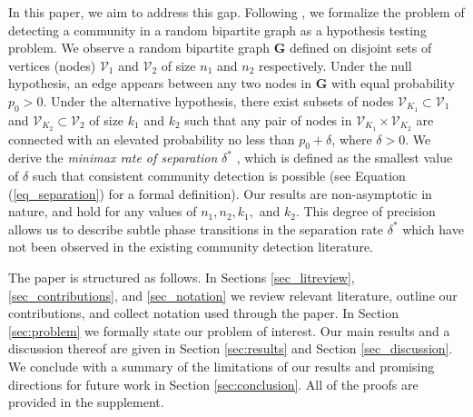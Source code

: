 \documentclass{article}
\newcommand{\bG}{\mathbf{G}}
\newcommand{\cV}{\mathcal{V}}
\begin{document}
In this paper, we aim to address this gap. Following \cite{arias2014community, verzelen2015community}, we formalize the problem of detecting a community in a random bipartite graph as a hypothesis testing problem. We observe a random bipartite graph $\bG$ defined on disjoint sets of vertices (nodes) $\cV_1$ and $\cV_2$ of size $n_1$ and $n_2$ respectively. Under the null hypothesis, an edge appears between any two nodes in $\bG$ with equal probability $p_0 > 0$. Under the alternative hypothesis, there exist subsets of nodes $\cV_{K_1} \subset \cV_1$ and $\cV_{K_2} \subset \cV_2$ of size $k_1$ and $k_2$ such that any pair of nodes in $\cV_{K_1} \times \cV_{K_2}$ are connected with an elevated probability no less than $p_0 + \delta$, where $\delta > 0$. We derive the \textit{minimax rate of separation} $\delta^*$ \cite{ingster2012nonparametric}, which is defined as the smallest value of $\delta$ such that consistent community detection is possible (see Equation (\ref{eq_separation}) for a formal definition). Our results are non-asymptotic in nature, and hold for any values of $n_1, n_2, k_1,$ and $k_2$. This degree of precision allows us to describe subtle phase transitions in the separation rate $\delta^*$ which have not been observed in the existing community detection literature.   






The paper is structured as follows. In Sections \ref{sec_litreview}, \ref{sec_contributions}, and \ref{sec_notation} we review relevant literature, outline our contributions, and collect notation used through the paper. In Section \ref{sec:problem} we formally state our problem of interest. Our main results and a discussion thereof are given in Section \ref{sec:results} and Section \ref{sec_discussion}. We conclude with a summary of the limitations of our results and promising directions for future work in Section \ref{sec:conclusion}. All of the proofs are provided in the supplement.
\end{document}
